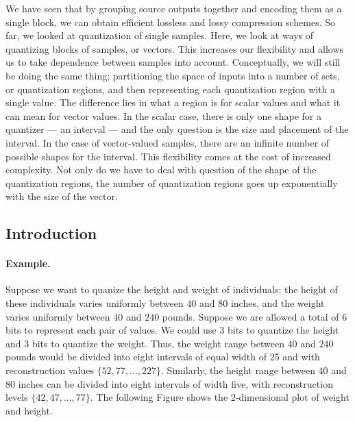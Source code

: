 
We have seen that by grouping source outputs together and encoding them as a single block, we can obtain efficient lossless and lossy compression schemes. So far, we looked at quantization of single samples. Here, we look at ways of quantizing blocks of samples, or vectors. This increases our flexibility and allows us to take dependence between samples into account. Conceptually, we will still be doing the same thing; partitioning the space of inputs into a number of sets, or quantization regions, and then representing each quantization region with a single value. The difference lies in what a region is for scalar values and what it can mean for vector values. In the scalar case, there is only one shape for a quantizer — an interval — and the only question is the size and placement of the interval. In the case of vector-valued samples, there are an infinite number of possible shapes for the interval. This flexibility comes at the cost of increased complexity. Not only do we have to deal with question of the shape of the quantization regions, the number of quantization regions goes up exponentially with the size of the vector.

\subsection{Introduction}

\paragraph{Example.} Suppose we want to quanize the height and weight of individuals; the height of these individuals varies uniformly between $40$ and $80$ inches, and the weight varies uniformly between $40$ and $240$ pounds. Suppose we are allowed a total of $6$ bits to represent each pair of values. We could use $3$ bits to quantize the height and $3$ bits to quantize the weight. Thus, the weight range between $40$ and $240$ pounds would be divided into eight intervals of equal width of 25 and with reconstruction values $\{52, 77, . . . , 227\}$. Similarly, the height range between $40$ and $80$ inches can be divided into eight intervals of width five, with reconstruction levels $\{42, 47, . . . , 77\}$. The following Figure shows the 2-dimensional plot of weight and height.

